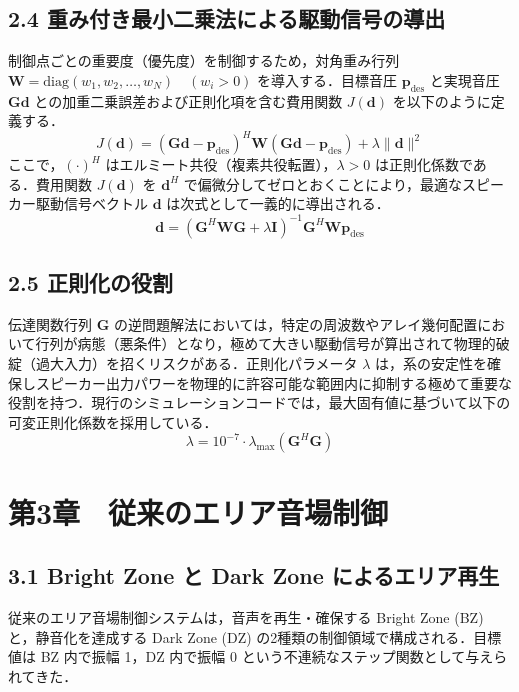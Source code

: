 \documentclass[11pt, a4paper]{article}
\begin{document}
\subsection{2.4 重み付き最小二乗法による駆動信号の導出}
制御点ごとの重要度（優先度）を制御するため，対角重み行列 $\mathbf{W} = \mathrm{diag}(w_1, w_2, \dots, w_N) \quad (w_i > 0)$ を導入する．目標音圧 $\mathbf{p}_{\mathrm{des}}$ と実現音圧 $\mathbf{G}\mathbf{d}$ との加重二乗誤差および正則化項を含む費用関数 $J(\mathbf{d})$ を以下のように定義する．
\begin{equation}
J(\mathbf{d}) = (\mathbf{G}\mathbf{d} - \mathbf{p}_{\mathrm{des}})^H \mathbf{W} (\mathbf{G}\mathbf{d} - \mathbf{p}_{\mathrm{des}}) + \lambda \|\mathbf{d}\|^2
\end{equation}
ここで，$(\cdot)^H$ はエルミート共役（複素共役転置），$\lambda > 0$ は正則化係数である．費用関数 $J(\mathbf{d})$ を $\mathbf{d}^H$ で偏微分してゼロとおくことにより，最適なスピーカー駆動信号ベクトル $\mathbf{d}$ は次式として一義的に導出される．
\begin{equation}
\mathbf{d} = (\mathbf{G}^H \mathbf{W} \mathbf{G} + \lambda \mathbf{I})^{-1} \mathbf{G}^H \mathbf{W} \mathbf{p}_{\mathrm{des}}
\end{equation}

\subsection{2.5 正則化の役割}
伝達関数行列 $\mathbf{G}$ の逆問題解法においては，特定の周波数やアレイ幾何配置において行列が病態（悪条件）となり，極めて大きい駆動信号が算出されて物理的破綻（過大入力）を招くリスクがある．正則化パラメータ $\lambda$ は，系の安定性を確保しスピーカー出力パワーを物理的に許容可能な範囲内に抑制する極めて重要な役割を持つ．現行のシミュレーションコードでは，最大固有値に基づいて以下の可変正則化係数を採用している．
\begin{equation}
\lambda = 10^{-7} \cdot \lambda_{\max}(\mathbf{G}^H \mathbf{G})
\end{equation}

\section{第3章　従来のエリア音場制御}

\subsection{3.1 Bright Zone と Dark Zone によるエリア再生}
従来のエリア音場制御システムは，音声を再生・確保する Bright Zone (BZ) と，静音化を達成する Dark Zone (DZ) の2種類の制御領域で構成される．目標値は BZ 内で振幅 1，DZ 内で振幅 0 という不連続なステップ関数として与えられてきた．
\end{document}

